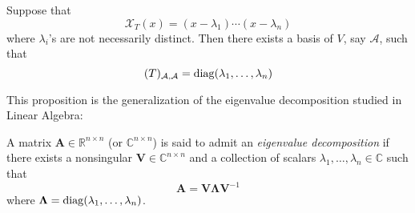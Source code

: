 \begin{proposition}\label{pro:7:12}
Suppose that 
\[
\mathcal{X}_T(x) = (x-\lambda_1)\cdots(x-\lambda_n)
\]
where $\lambda_i$'s are not necessarily distinct.
Then there exists a basis of $V$, say $\mathcal{A}$, such that
\[
(T)_{\mathcal{A},\mathcal{A}}=\operatorname{diag}(\lambda_1,\dots,\lambda_n)
\]
\end{proposition}
\begin{remark}
This proposition is the generalization of the eigenvalue decomposition studied in Linear Algebra:
\begin{definition}
A matrix $\bm A\in\mathbb{R}^{n\times n}$ (or $\mathbb{C}^{n\times n}$) is said to admit an \emph{eigenvalue decomposition} if there exists a nonsingular $\bm V\in \mathbb{C}^{n\times n}$ and a collection of scalars $\lambda_1,\dots,\lambda_n\in\mathbb{C}$ such that
\[
\bm A=\bm V\bm\Lambda\bm V^{-1}
\]
where $\bm\Lambda=\operatorname{diag}(\lambda_1,\dots,\lambda_n)$.
\end{definition}
\end{remark}

